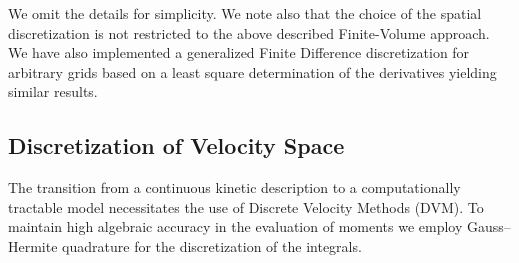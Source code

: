 \documentclass[final,11pt]{siamart251216}
\numberwithin{equation}{section}
\theoremstyle{definition}
\theoremstyle{remark}
\begin{document}
We omit the details for simplicity.
We note also that the choice of the spatial discretization is not restricted to the above described Finite-Volume approach. We have also implemented a generalized Finite Difference discretization for arbitrary  grids based on a least square determination of the 
derivatives yielding similar results.


\subsection{Discretization of Velocity Space}
The transition from a continuous kinetic description to a computationally tractable model necessitates the use of Discrete Velocity Methods (DVM). To maintain high algebraic accuracy in the evaluation of moments we employ Gauss--Hermite quadrature for the discretization of the integrals.
\end{document}
